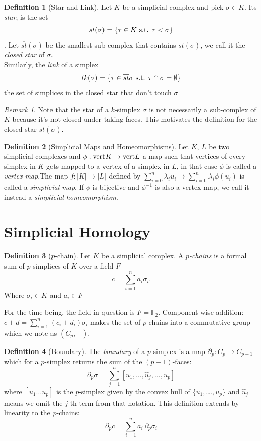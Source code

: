 \documentclass{article}
\newcommand{\inv}{^{-1}}
\newcommand{\vertices}{\textmd{vert}}
\newcommand{\st}{\textmd{ s.t. }}
\theoremstyle{plain}
\theoremstyle{definition}
\newtheorem{definition}{Definition}[section]
\theoremstyle{remark}
\newtheorem{remark}{Remark}[section]
\begin{document}
	\begin{definition}[Star and Link]
		Let $K$ be a simplicial complex and pick $ \sigma \in K $. Its \emph{star}, is the set \[ st (\sigma) = \{ \tau \in K \st \tau < \sigma \} \].
		Let $\overline{st} (\sigma)$ be the smallest sub-complex that contains $st(\sigma)$, we call it the \emph{closed star} of $\sigma$. \\
		Similarly, the \emph{link} of a simplex \[ lk (\sigma) = \{ \tau \in \overline{st}\sigma \st \tau \cap \sigma = \emptyset \} \] the set of simplices in the closed star that don't touch $\sigma$
	\end{definition}
	\begin{remark}
        Note that the star of a $k$-simplex $\sigma$ is not necessarily a sub-complex of $K$ because it's not closed under taking faces. This motivates the definition for the closed star $ \overline{st} (\sigma) $.
	\end{remark}
	\begin{definition}[Simplicial Maps and Homeomorphisms]
		Let $K$, $L$ be two simplicial complexes and $ \phi: \vertices K \to \vertices L $ a map such that vertices of every simplex in $K$ gets mapped to a vertex of a simplex in $L$, in that case $\phi$ is called a \emph{vertex map}.The map $f: |K| \to |L|$ defined by $ \sum_{i=0}^n \lambda_i u_i \mapsto \sum_{i=0}^n \lambda_i \phi(u_i) $ is called a \emph{simplicial map}. If $ \phi $ is bijective and $ \phi\inv $ is also a vertex map, we call it instead a \emph{simplicial homeomorphism}.
	\end{definition}

	\section{Simplicial Homology}
	\begin{definition}[$p$-chain]
		Let $K$ be a simplicial complex. A \emph{$ p $-chains} is a formal sum of $p$-simplices of $K$ over a field $F$ \[ c = \sum_{i=1}^{n} a_i \sigma_i. \] Where $\sigma_i \in K$ and $a_i \in F$
	\end{definition}
	For the time being, the field in question is $F = \mathbb{F}_2 $. Component-wise addition: $ c + d = \sum_{i=1}^n (c_i + d_i) \sigma_i $ makes the set of $p$-chains into a commutative group which we note as $ (C_p, +) $.
\begin{definition}[Boundary]
	The \emph{boundary} of a $ p $-simplex is a map $ \partial_p : C_p \to C_{p-1} $ which for a $p$-simplex returns the sum of the $ (p-1) $-faces: \[ \partial_p \sigma = \sum_{j=1}^n [u_1, \dots , \hat{u}_j , \dots , u_p] \]
	where $[ u_1 \dots u_p ]$ is the $p$-simplex given by the convex hull of $\{u_1, \dots , u_p\}$ and $\hat{u}_j$ means we omit the $j$-th term from that notation.
	This definition extends by linearity to the $p$-chains: \[ \partial_p c = \sum_{i=1}^{n} a_i \ \partial_p\sigma_i  \]
\end{definition}
\end{document}
